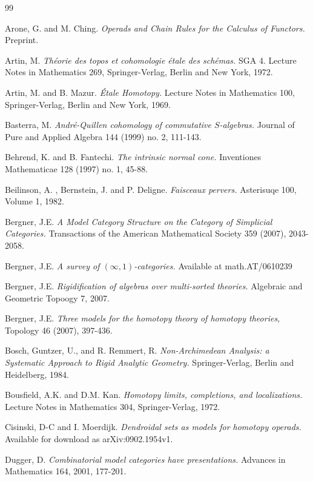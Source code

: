 \documentclass{article}
\newcommand{\Andre}{Andr\'{e}}
\theoremstyle{definition}
\begin{document}
\begin{thebibliography}{99}

 Arone, G. and M. Ching. {\it Operads and Chain Rules for the Calculus
of Functors.} Preprint.

 Artin, M. {\it Th\'{e}orie des topos et cohomologie
\'{e}tale des sch\'{e}mas.} SGA 4. Lecture Notes in Mathematics
269, Springer-Verlag, Berlin and New York, 1972.

 Artin, M. and B. Mazur. {\it \'{E}tale Homotopy.} Lecture Notes in Mathematics 100, Springer-Verlag, Berlin and New York, 1969.

 Basterra, M. {\it \Andre-Quillen cohomology of commutative $S$-algebras.} Journal of Pure and Applied Algebra 144 (1999) no. 2, 111-143.

 Behrend, K. and B. Fantechi. {\it The intrinsic
normal cone.} Inventiones Mathematicae 128 (1997) no. 1, 45-88.

 Beilinson, A. , Bernstein, J. and P. Deligne.
{\it Faisceaux pervers.} Asterisuqe 100, Volume 1, 1982.

 Bergner, J.E. {\it A Model Category Structure on the Category of Simplicial Categories.} Transactions of the American Mathematical Society 359 (2007), 2043-2058.

 Bergner, J.E. {\it A survey of $(\infty,1)$-categories.} Available at math.AT/0610239

 Bergner, J.E. {\it Rigidification of algebras over multi-sorted theories.}
Algebraic and Geometric Topoogy 7, 2007.

 Bergner, J.E. {\it Three models for the homotopy theory of homotopy theories,} Topology 46 (2007), 397-436.

 Bosch, Guntzer, U., and R. Remmert, R. {\it Non-Archimedean Analysis: a Systematic Approach to Rigid Analytic Geometry.} Springer-Verlag, Berlin and Heidelberg, 1984.

 Bousfield, A.K. and D.M. Kan. {\it Homotopy
limits, completions, and localizations.} Lecture Notes in
Mathematics 304, Springer-Verlag, 1972.

 Cisinski, D-C and I. Moerdijk. {\it Dendroidal sets as models for homotopy operads.} Available for download as arXiv:0902.1954v1.

 Dugger, D. {\it Combinatorial model categories have presentations.} Advances in Mathematics 164, 2001, 177-201.


\end{thebibliography}
\end{document}
